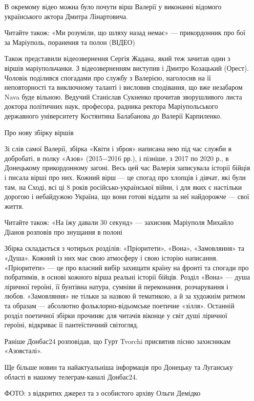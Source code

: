 В окремому відео можна було почути вірш Валерії у виконанні відомого
українського актора Дмитра Лінартовича.

Читайте також: «Ми розуміли, що шляху назад немає» — прикордонник про бої за
Маріуполь, поранення та полон (ВІДЕО)

Також представили відеозвернення Сергія Жадана, який теж зачитав один з віршів
маріупольчанки. З відеозверненням виступив і Дмитро Козацький (Орест). Чоловік
поділився спогадами про службу з Валерією, наголосив на її неповторності та
виключному таланті і висловив сподівання, що вже незабаром Nava буде вільною.
Ведучий Станіслав Сукненко прочитав зворушливого листа доктора політичних наук,
професора, радника ректора Маріупольського державного університету Костянтина
Балабанова до Валерії Карпиленко. 

Про нову збірку віршів

Зі слів самої Валерії, збірка «Квіти і зброя» написана нею під час служби в
добробаті, в полку «Азов» (2015−2016 рр.), і пізніше, з 2017 по 2020 р., в
Донецькому прикордонному загоні. Весь цей час Валерія записувала історії бійців
і писала вірші про них. Кожний вірш — це спогад про хлопців і дівчат, які були
там, на Сході, всі ці 8 років російсько-української війни, і для яких є
настільки дорогою і небайдужою Україна, що вони готові віддати за неї
найдорожче — свої життя.

Читайте також: «На їжу давали 30 секунд» — захисник Маріуполя Михайло Діанов розповів про знущання в полоні

Збірка складається з чотирьох розділів: «Пріоритети», «Вона», «Замовляння» та
«Душа». Кожний із них має свою атмосферу і свою історію написання. «Пріоритети»
— це про власний вибір захищати країну на фронті та спогади про побратимів, в
основі кожного вірша реальні історії бійців. Розділ «Вона» — душа ліричної
героїні, її бунтівна натура, сумніви й переконання, розчарування і любов.
«Замовляння» не тільки за назвою й тематикою, а й за художнім ритмом та образам
— абсолютно фольклорно-відьомське поетичне «зілля». Останній розділ поетичної
збірки прочиняє для читачів віконце у світ душі ліричної героїні, відкриває її
пантеїстичний світогляд.

Раніше Донбас24 розповідав, що Гурт Tvorchi присвятив пісню захисникам
«Азовсталі».

Ще більше новин та найактуальніша інформація про Донецьку та Луганську області
в нашому телеграм-каналі Донбас24.

ФОТО: з відкритих джерел та з особистого архіву Ольги Демідко
